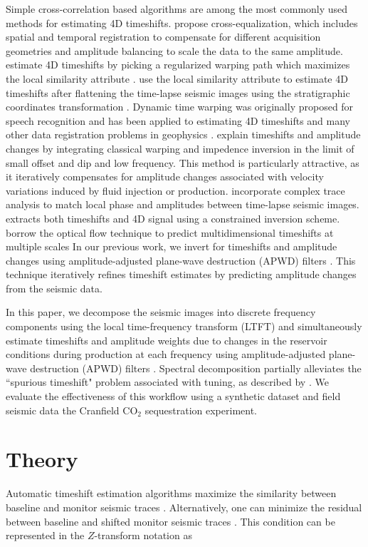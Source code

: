 Simple cross-correlation based algorithms are among the most commonly used methods for estimating 4D timeshifts.
\cite{rickett} propose cross-equalization, which includes spatial and temporal registration to compensate for different acquisition geometries and amplitude balancing to scale the data to the same amplitude.
\cite{fomel09} estimate 4D timeshifts by picking a regularized warping path which maximizes the local similarity attribute \cite[]{local}.
\cite{karimi16} use the local similarity attribute to estimate 4D timeshifts after flattening the time-lapse seismic images using the stratigraphic coordinates transformation \cite[]{karimi15}.
Dynamic time warping \cite[]{sakoe} was originally proposed for speech recognition and has been applied to estimating 4D timeshifts and many other data registration problems in geophysics \cite[]{dtw}. 
\cite{williamson} explain timeshifts and amplitude changes by integrating classical warping and impedence inversion in the limit of small offset and dip and low frequency. 
This method is particularly attractive, as it iteratively compensates for amplitude changes associated with velocity variations induced by fluid injection or production. 
\cite{hoeber} incorporate complex trace analysis \cite[]{taner} to match local phase and amplitudes between time-lapse seismic images. 
\cite{lie} extracts both timeshifts and 4D signal using a constrained inversion scheme. 
\cite{zhang16} borrow the optical flow technique \cite[]{horn} to predict multidimensional timeshifts at multiple scales
In our previous work, we invert for timeshifts and amplitude changes using amplitude-adjusted plane-wave destruction (APWD) filters \cite[]{phillips}. 
This technique iteratively refines timeshift estimates by predicting amplitude changes from the seismic data. 

In this paper, we decompose the seismic images into discrete frequency components using the local time-frequency transform (LTFT) \cite[]{liu} and simultaneously estimate timeshifts and amplitude weights due to changes in the reservoir conditions during production at each frequency using amplitude-adjusted plane-wave destruction (APWD) filters \cite[]{phillips}.
Spectral decomposition partially alleviates the ``spurious timeshift" problem associated with tuning, as described by \cite{macbeth}.
We evaluate the effectiveness of this workflow using a synthetic dataset and field seismic data the Cranfield CO$_2$ sequestration experiment.

\section{Theory}
Automatic timeshift estimation algorithms maximize the similarity between baseline and monitor seismic traces \cite[]{xcor,fomel09}. 
Alternatively, one can minimize the residual between baseline and shifted monitor seismic traces \cite[]{dtw,phillips}. 
This condition can be represented in the $Z$-transform notation as

